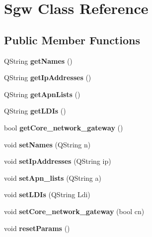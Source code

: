 \hypertarget{class_sgw}{}\section{Sgw Class Reference}
\label{class_sgw}
\subsection*{Public Member Functions}
\begin{DoxyCompactItemize}
\item 
Q\+String {\bfseries get\+Names} ()\hypertarget{class_sgw_aeb513196c6dea0fc69f8846bd3472053}{}\label{class_sgw_aeb513196c6dea0fc69f8846bd3472053}

\item 
Q\+String {\bfseries get\+Ip\+Addresses} ()\hypertarget{class_sgw_a616b95934853eb9f2ffdfe4043767a71}{}\label{class_sgw_a616b95934853eb9f2ffdfe4043767a71}

\item 
Q\+String {\bfseries get\+Apn\+Lists} ()\hypertarget{class_sgw_a39c6d95f3fef1ffa7c5e1ff2893889a5}{}\label{class_sgw_a39c6d95f3fef1ffa7c5e1ff2893889a5}

\item 
Q\+String {\bfseries get\+L\+D\+Is} ()\hypertarget{class_sgw_aaa523b2cda9d6674744b6e05e29efe94}{}\label{class_sgw_aaa523b2cda9d6674744b6e05e29efe94}

\item 
bool {\bfseries get\+Core\+\_\+network\+\_\+gateway} ()\hypertarget{class_sgw_ad39747c0022d723bf013a93d250c9fd3}{}\label{class_sgw_ad39747c0022d723bf013a93d250c9fd3}

\item 
void {\bfseries set\+Names} (Q\+String n)\hypertarget{class_sgw_adbb9de6517e4cad15259eb1f68d9acfb}{}\label{class_sgw_adbb9de6517e4cad15259eb1f68d9acfb}

\item 
void {\bfseries set\+Ip\+Addresses} (Q\+String ip)\hypertarget{class_sgw_a63e3feba783dbf7c81d010b3e90e6c1a}{}\label{class_sgw_a63e3feba783dbf7c81d010b3e90e6c1a}

\item 
void {\bfseries set\+Apn\+\_\+lists} (Q\+String a)\hypertarget{class_sgw_a23b34425b1e213daf3fded8469ef8dfe}{}\label{class_sgw_a23b34425b1e213daf3fded8469ef8dfe}

\item 
void {\bfseries set\+L\+D\+Is} (Q\+String Ldi)\hypertarget{class_sgw_a0696505178858351ef1348fe581fae80}{}\label{class_sgw_a0696505178858351ef1348fe581fae80}

\item 
void {\bfseries set\+Core\+\_\+network\+\_\+gateway} (bool cn)\hypertarget{class_sgw_ab47b0ac9c1ca1b4f02abc43d34b3e7cb}{}\label{class_sgw_ab47b0ac9c1ca1b4f02abc43d34b3e7cb}

\item 
void {\bfseries reset\+Params} ()\hypertarget{class_sgw_a63878a03fd5e69fca647ab5d721208eb}{}\label{class_sgw_a63878a03fd5e69fca647ab5d721208eb}

\end{DoxyCompactItemize}


